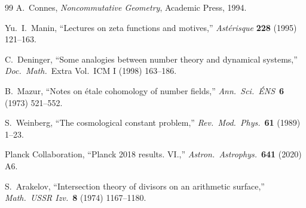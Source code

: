 \documentclass[12pt,a4paper]{article}
\theoremstyle{definition}
\begin{document}
\begin{thebibliography}{99}
A.~Connes, \textit{Noncommutative Geometry}, Academic Press, 1994.

Yu.~I.~Manin, ``Lectures on zeta functions and motives,''
\textit{Ast\'erisque} \textbf{228} (1995) 121--163.

C.~Deninger, ``Some analogies between number theory and dynamical systems,''
\textit{Doc.\ Math.}\ Extra Vol.\ ICM I (1998) 163--186.

B.~Mazur, ``Notes on \'etale cohomology of number fields,''
\textit{Ann.\ Sci.\ \'ENS}\ \textbf{6} (1973) 521--552.

S.~Weinberg, ``The cosmological constant problem,''
\textit{Rev.\ Mod.\ Phys.}\ \textbf{61} (1989) 1--23.

Planck Collaboration, ``Planck 2018 results. VI.,''
\textit{Astron.\ Astrophys.}\ \textbf{641} (2020) A6.

S.~Arakelov, ``Intersection theory of divisors on an arithmetic surface,''
\textit{Math.\ USSR Izv.}\ \textbf{8} (1974) 1167--1180.

\end{thebibliography}
\end{document}
